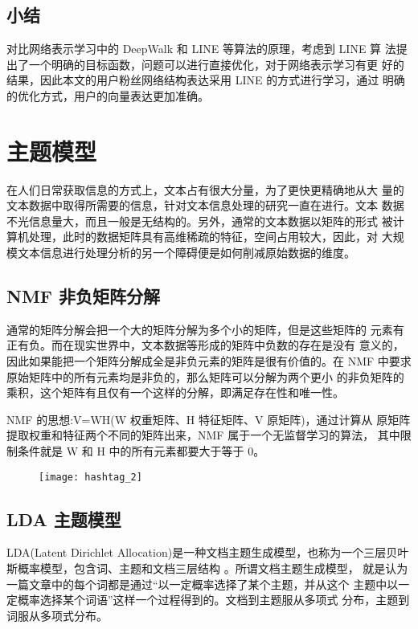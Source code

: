 \subsection{小结}
对比网络表示学习中的 DeepWalk 和 LINE 等算法的原理，考虑到 LINE 算
法提出了一个明确的目标函数，问题可以进行直接优化，对于网络表示学习有更
 好的结果，因此本文的用户粉丝网络结构表达采用 LINE 的方式进行学习，通过 明确的优化方式，用户的向量表达更加准确。

\section{主题模型}
在人们日常获取信息的方式上，文本占有很大分量，为了更快更精确地从大 量的文本数据中取得所需要的信息，针对文本信息处理的研究一直在进行。文本 数据不光信息量大，而且一般是无结构的。另外，通常的文本数据以矩阵的形式 被计算机处理，此时的数据矩阵具有高维稀疏的特征，空间占用较大，因此，对 大规模文本信息进行处理分析的另一个障碍便是如何削减原始数据的维度。


\subsection{NMF 非负矩阵分解}
通常的矩阵分解会把一个大的矩阵分解为多个小的矩阵，但是这些矩阵的 元素有正有负。而在现实世界中，文本数据等形成的矩阵中负数的存在是没有 意义的，因此如果能把一个矩阵分解成全是非负元素的矩阵是很有价值的。在 NMF 中要求原始矩阵中的所有元素均是非负的，那么矩阵可以分解为两个更小 的非负矩阵的乘积，这个矩阵有且仅有一个这样的分解，即满足存在性和唯一性\citep{Du2010Nonnegative}。

NMF 的思想:V=WH(W 权重矩阵、H 特征矩阵、V 原矩阵)，通过计算从 原矩阵提取权重和特征两个不同的矩阵出来，NMF 属于一个无监督学习的算法， 其中限制条件就是 W 和 H 中的所有元素都要大于等于 0。

\begin{figure}[H]
    \centering
    \texttt{[image: hashtag\_2]}
    \label{fig:piu_5}
\end{figure}

\subsection{LDA 主题模型}

LDA(Latent Dirichlet Allocation)是一种文档主题生成模型，也称为一个三层贝叶斯概率模型，包含词、主题和文档三层结构 \citep{Blei2003Latent}。所谓文档主题生成模型，
 就是认为一篇文章中的每个词都是通过“以一定概率选择了某个主题，并从这个 主题中以一定概率选择某个词语”这样一个过程得到的。文档到主题服从多项式 分布，主题到词服从多项式分布。
 
